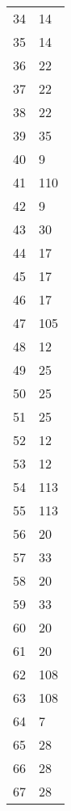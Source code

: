 \documentclass[12pt]{scrartcl}
\begin{document}
\begin{minipage}[t]{.30\textwidth}
    \begin{tabular}{cl}
        34 &    14\\
        35 &    14\\
        36 &    22\\
        37 &    22\\
        38 &    22\\
        39 &    35\\
        40 &     9\\
        41 &   110\\
        42 &     9\\
        43 &    30\\
        44 &    17\\
        45 &    17\\
        46 &    17\\
        47 &   105\\
        48 &    12\\
        49 &    25\\
        50 &    25\\
        51 &    25\\
        52 &    12\\
        53 &    12\\
        54 &   113\\
        55 &   113\\
        56 &    20\\
        57 &    33\\
        58 &    20\\
        59 &    33\\
        60 &    20\\
        61 &    20\\
        62 &   108\\
        63 &   108\\
        64 &     7\\
        65 &    28\\
        66 &    28\\
        67 &    28\\
    \end{tabular}
\end{minipage}\hfil
\end{document}
